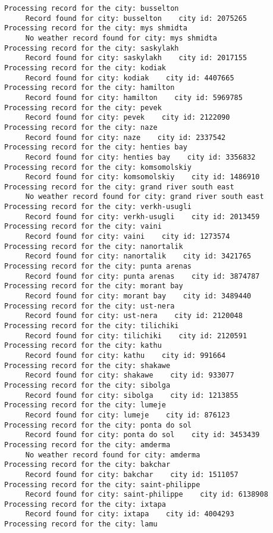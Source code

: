 \documentclass[11pt]{article}
\begin{document}
\begin{Verbatim}[commandchars=\\\{\}]
Processing record for the city: busselton
     Record found for city: busselton    city id: 2075265
Processing record for the city: mys shmidta
     No weather record found for city: mys shmidta
Processing record for the city: saskylakh
     Record found for city: saskylakh    city id: 2017155
Processing record for the city: kodiak
     Record found for city: kodiak    city id: 4407665
Processing record for the city: hamilton
     Record found for city: hamilton    city id: 5969785
Processing record for the city: pevek
     Record found for city: pevek    city id: 2122090
Processing record for the city: naze
     Record found for city: naze    city id: 2337542
Processing record for the city: henties bay
     Record found for city: henties bay    city id: 3356832
Processing record for the city: komsomolskiy
     Record found for city: komsomolskiy    city id: 1486910
Processing record for the city: grand river south east
     No weather record found for city: grand river south east
Processing record for the city: verkh-usugli
     Record found for city: verkh-usugli    city id: 2013459
Processing record for the city: vaini
     Record found for city: vaini    city id: 1273574
Processing record for the city: nanortalik
     Record found for city: nanortalik    city id: 3421765
Processing record for the city: punta arenas
     Record found for city: punta arenas    city id: 3874787
Processing record for the city: morant bay
     Record found for city: morant bay    city id: 3489440
Processing record for the city: ust-nera
     Record found for city: ust-nera    city id: 2120048
Processing record for the city: tilichiki
     Record found for city: tilichiki    city id: 2120591
Processing record for the city: kathu
     Record found for city: kathu    city id: 991664
Processing record for the city: shakawe
     Record found for city: shakawe    city id: 933077
Processing record for the city: sibolga
     Record found for city: sibolga    city id: 1213855
Processing record for the city: lumeje
     Record found for city: lumeje    city id: 876123
Processing record for the city: ponta do sol
     Record found for city: ponta do sol    city id: 3453439
Processing record for the city: amderma
     No weather record found for city: amderma
Processing record for the city: bakchar
     Record found for city: bakchar    city id: 1511057
Processing record for the city: saint-philippe
     Record found for city: saint-philippe    city id: 6138908
Processing record for the city: ixtapa
     Record found for city: ixtapa    city id: 4004293
Processing record for the city: lamu

\end{Verbatim}
\end{document}

